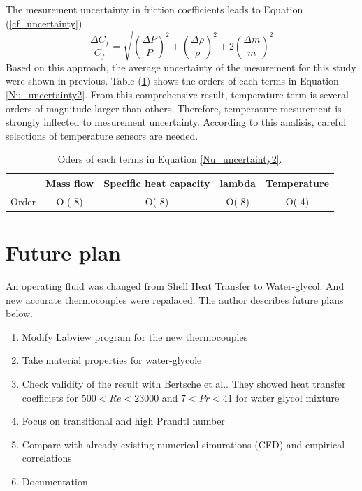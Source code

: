 \documentclass[conference]{IEEEtran}
\begin{document}
The mesurement uncertainty in friction coefficients leads to Equation (\ref{cf_uncertainty})
\begin{equation}
    \frac{\Delta C_{f}}{C_{f}} = \sqrt{\left(\frac{\Delta P}{P}\right)^{2}+\left(\frac{\Delta \rho}{\rho}\right)^{2}+2\left(\frac{\Delta \dot{m}}{\dot{m}}\right)^{2}}
    \label{cf_uncertainty}
\end{equation}
Based on this approach, the average uncertainty of the mesurement for this study were shown in previous.
Table (\ref{order}) shows the orders of each terms in Equation \ref{Nu_uncertainty2}.
From this comprehensive result, temperature term is several orders of magnitude larger than others.
Therefore, temperature mesurement is strongly inflected to mesurement uncertainty.
According to this analisis, careful selections of temperature sensors are needed.
\begin{table}[h]
 \caption{Oders of each terms in Equation \ref{Nu_uncertainty2}.}
 \label{order}
 \centering
 \begin{tabular}{ccccc}
\hline
      & Mass flow & Specific heat capacity & lambda & Temperature \\ \hline
Order & O (-8) & O(-8)  & O(-8) & O(-4)
 \end{tabular}
\end{table}

\newpage
\section{Future plan}
An operating fluid was changed from Shell Heat Transfer to Water-glycol.
And new accurate thermocouples were repalaced.
The author describes future plans below.
\begin{enumerate}
  \item Modify Labview program for the new thermocouples
  \item Take material properties for water-glycole
  \item Check validity of the result with Bertsche et al.\cite{Bertsche2016}.
  They showed heat transfer coefficiets for $500 < Re < 23000$ and $7 < Pr < 41$ for water glycol mixture
  \item Focus on transitional and high Prandtl number
  \item Compare with already existing numerical simurations (CFD) and empirical correlations
  \item Documentation
\end{enumerate}
\end{document}
